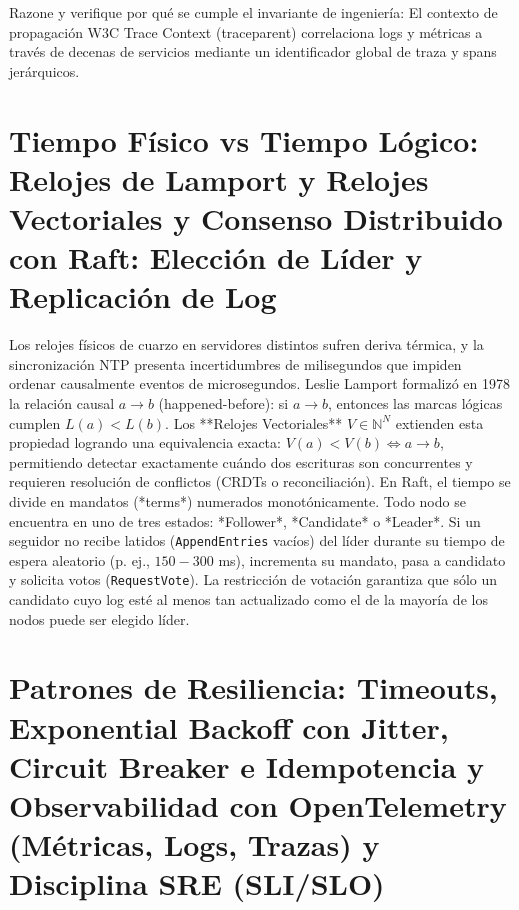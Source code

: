 \documentclass{book}
\begin{document}
\begin{tcolorbox}[title={Autoficha}, studiumcheck, breakable]

Razone y verifique por qué se cumple el invariante de ingeniería: El contexto de propagación W3C Trace Context (traceparent) correlaciona logs y métricas a través de decenas de servicios mediante un identificador global de traza y spans jerárquicos.
\end{tcolorbox}

\section{Tiempo Físico vs Tiempo Lógico: Relojes de Lamport y Relojes Vectoriales y Consenso Distribuido con Raft: Elección de Líder y Replicación de Log}

Los relojes físicos de cuarzo en servidores distintos sufren deriva térmica, y la sincronización NTP presenta incertidumbres de milisegundos que impiden ordenar causalmente eventos de microsegundos. Leslie Lamport formalizó en 1978 la relación causal \(a \to b\) (happened-before): si \(a \to b\), entonces las marcas lógicas cumplen \(L(a) < L(b)\). Los **Relojes Vectoriales** \(V \in \mathbb{N}^N\) extienden esta propiedad logrando una equivalencia exacta: \(V(a) < V(b) \iff a \to b\), permitiendo detectar exactamente cuándo dos escrituras son concurrentes y requieren resolución de conflictos (CRDTs o reconciliación).
En Raft, el tiempo se divide en mandatos (*terms*) numerados monotónicamente. Todo nodo se encuentra en uno de tres estados: *Follower*, *Candidate* o *Leader*. Si un seguidor no recibe latidos (\texttt{AppendEntries} vacíos) del líder durante su tiempo de espera aleatorio (p. ej., \(150-300\) ms), incrementa su mandato, pasa a candidato y solicita votos (\texttt{RequestVote}). La restricción de votación garantiza que sólo un candidato cuyo log esté al menos tan actualizado como el de la mayoría de los nodos puede ser elegido líder.

\section{Patrones de Resiliencia: Timeouts, Exponential Backoff con Jitter, Circuit Breaker e Idempotencia y Observabilidad con OpenTelemetry (Métricas, Logs, Trazas) y Disciplina SRE (SLI/SLO)}
\end{document}
